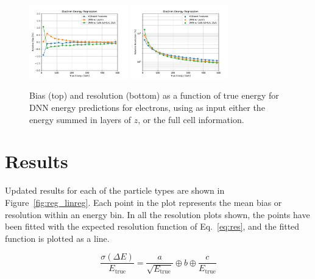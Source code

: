 \begin{figure}[htbp]
\centering
\includegraphics[width=0.38\textwidth]{Images/Calo/bias_vs_E_EleFixed_nn_inputs_zoom.pdf}
\includegraphics[width=0.38\textwidth]{Images/Calo/res_vs_E_EleFixed_nn_inputs_fits.pdf}
\caption{Bias (top) and resolution (bottom) as a function of true energy for DNN energy predictions for electrons, using as input either the energy summed in layers of $z$, or the full cell information.\label{fig:reg_dnn_inputs}}
\end{figure}

\section{Results}








Updated results for each of the particle types are shown in Figure~\ref{fig:reg_linreg}. Each point in the plot represents the mean bias or resolution within an energy bin. In all the resolution plots shown, the points have been fitted with the expected resolution function of Eq.~\ref{eq:res}, and the fitted function is plotted as a line.

\begin{equation}
\frac{\sigma(\Delta E)}{E_{\text{true}}} = \frac{a}{\sqrt{E_{\text{true}}}} \oplus b \oplus \frac{c}{E_{\text{true}}}
\label{eq:res}
\end{equation}

